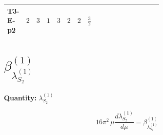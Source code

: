 \documentclass[8pt]{article}
\begin{document}
\begin{landscape}
\begin{longtable}{@{}llcccccc >{\raggedright\arraybackslash}p{0.21\linewidth} >{\raggedright\arraybackslash}p{0.21\linewidth} >{\raggedright\arraybackslash}p{0.21\linewidth}@{}}
T3-E-p2 & $2$ & $3$ & $1$ & $3$ & $2$ & $2$ & $\frac{3}{2}$ & \scriptsize\adjustbox{max width=\linewidth}{$\begin{gathered} +8 {\lambda_{12}^{(1)}} {\lambda_{12}^{(\times)}}\end{gathered}$} & \scriptsize\adjustbox{max width=\linewidth}{$\begin{gathered} +6 {\lambda_{12}^{(A)}}^2\end{gathered}$} & \scriptsize\adjustbox{max width=\linewidth}{$\begin{gathered} +6 {\lambda_{12}^{(\times)}}^2\end{gathered}$} \\
\midrule
\bottomrule
\end{longtable}
\clearpage
\section*{$\beta_{\lambda_{S_2}^{(1)}}^{(1)}$}
\noindent\textbf{Quantity: }$\lambda_{S_2}^{(1)}$\par\smallskip
\[16\pi^2\,\mu\frac{d \lambda_{S_2}^{(1)}}{d\mu}=\beta_{\lambda_{S_2}^{(1)}}^{(1)}\]

\end{landscape}
\end{document}

